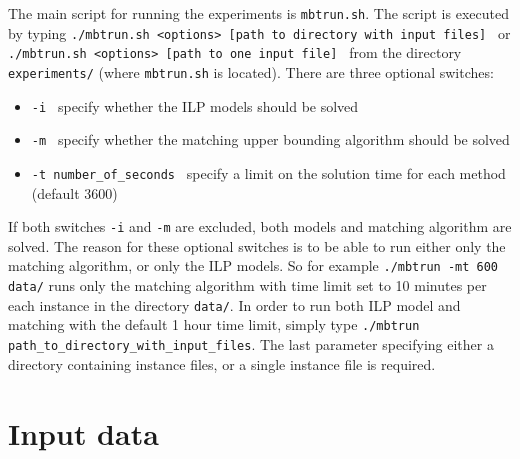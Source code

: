 \documentclass[12pt]{article}
\begin{document}
The main script for running the experiments is \texttt{mbtrun.sh}.
The script is executed by typing \newline\newline
\texttt{./mbtrun.sh <options> [path to directory with input files] }\newline\newline
or\newline\newline 
\texttt{./mbtrun.sh <options> [path to one input file] }\newline\newline
from the directory \texttt{experiments/} (where \texttt{mbtrun.sh} is located).
There are three optional switches:
\begin{itemize}
	\item[] \texttt{-i }  specify whether the ILP models should be solved 
	\item[] \texttt{-m }  specify whether the matching upper bounding algorithm should be solved 
	\item[] \texttt{-t number\_of\_seconds }  specify a limit on the solution time for each method (default 3600)
\end{itemize}
If both switches \texttt{-i} and \texttt{-m} are excluded, both models and matching algorithm are solved.
The reason for these optional switches is to be able to run either only the matching algorithm, or only the ILP models.
So for example \newline\newline
\texttt{./mbtrun -mt 600 data/} 
\newline\newline
runs only the matching algorithm with time limit set to 10 minutes per each instance in the directory \texttt{data/}.
In order to run both ILP model and matching with the default 1 hour time limit, simply type \newline\newline
\texttt{./mbtrun path\_to\_directory\_with\_input\_files}.
\newline\newline
The last parameter specifying either a directory containing instance files, or a single instance file is required.

\section{Input data}
\end{document}
